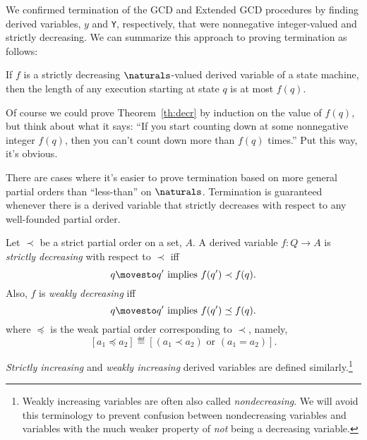 We confirmed termination of the GCD and Extended GCD procedures by finding
derived variables, $y$ and \texttt{Y}, respectively, that were nonnegative
integer-valued and strictly decreasing.  We can summarize this approach to
proving termination as follows:
\begin{theorem}
\label{th:decr}
If $f$ is a strictly decreasing $\naturals$-valued derived variable of a
state machine, then the length of any execution starting at state $q$ is
at most $f(q)$.
\end{theorem}

Of course we could prove Theorem~\ref{th:decr} by induction on the value
of $f(q)$, but think about what it says: ``If you start counting down at
some nonnegative integer $f(q)$, then you can't count down more than
$f(q)$ times.''  Put this way, it's obvious.

There are cases where it's easier to prove termination based on more
general partial orders than ``less-than'' on $\naturals$.  Termination is
guaranteed whenever there is a derived variable that strictly decreases with
respect to any well-founded partial order.

\iffalse
We now define some other useful flavors of derived variables taking values
over partial ordered sets.  We'll use the notational convention that when
$\prec$ denotes a strict partial order on some set, then $\preceq$ is the
corresponding \emph{weak} partial order
\[
a\preceq a' \ \eqdef\quad a \prec a' \lor a = a'.
\]

A relation like $\prec$ is called a \emph{strict} partial order.  It is
transitive, antisymmetric, and but \emph{non}reflexive in the strongest
sense: $a \not\prec a$ for every $a \in A$.\footnote{In other words, if $a
\prec b$, then it is not the case that $b \prec a$.  This property is also
called \emph{a}symmetry.}\fi

\begin{definition}
Let $\prec$ be a strict partial order on a set, $A$.  A derived variable
$f : Q \to A$ is \emph{strictly decreasing} with respect to $\prec$ iff
\[
q \movesto q' \text{ implies } f(q') \prec f(q).
\]
Also, $f$ is \emph{weakly decreasing} iff
\[
q \movesto q' \text{  implies  } f(q') \preceq f(q).
\]
where $\preceq$ is the weak partial order corresponding to $\prec$,
namely,
\[
[a_1 \preceq a_2] \eqdef [(a_1 \prec a_2) \text{ or } (a_1=a_2)].
\]

\emph{Strictly increasing} and \emph{weakly increasing} derived variables
are defined similarly.\footnote{Weakly increasing variables are often also
called \emph{nondecreasing}.  We will avoid this terminology to prevent
confusion between nondecreasing variables and variables with the much
weaker property of \emph{not} being a decreasing variable.}
\end{definition}


